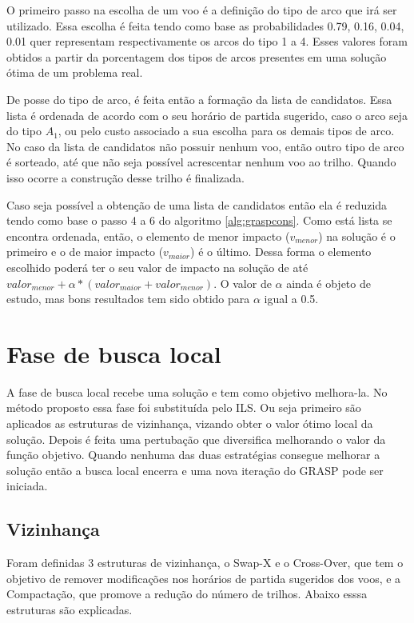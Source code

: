  O primeiro passo na escolha de um voo é a definição do tipo de arco que irá ser utilizado. Essa escolha é feita tendo como base as probabilidades 0.79, 0.16, 0.04, 0.01 quer representam respectivamente os arcos do tipo 1 a 4. Esses valores foram obtidos a partir da porcentagem dos tipos de arcos presentes em uma solução ótima de um problema real.
 
 De posse do tipo de arco, é feita então a formação da lista de candidatos. Essa lista é ordenada de acordo com o seu horário de partida sugerido, caso o arco seja do tipo $A_{1}$, ou pelo custo associado a sua escolha para os demais tipos de arco. No caso da lista de candidatos não possuir nenhum voo, então outro tipo de arco é sorteado, até que não seja possível acrescentar nenhum voo ao trilho. Quando isso ocorre a construção desse trilho é finalizada.
 
 Caso seja possível a obtenção de uma lista de candidatos então ela é reduzida tendo como base o passo 4 a 6 do algoritmo \ref{alg:graspcons}. Como está lista se encontra ordenada, então, o elemento de menor impacto ($v_{menor}$) na solução é o primeiro e o de maior impacto ($v_{maior}$) é o último. Dessa forma o elemento escolhido poderá ter o seu valor de impacto na solução de até $valor_{menor} + \alpha*(valor_{maior} + valor_{menor})$. O valor de $\alpha$ ainda é objeto de estudo, mas bons resultados tem sido obtido para $\alpha$ igual a 0.5.
 
 \section{Fase de busca local}
 
A fase de busca local recebe uma solução e tem como objetivo melhora-la. No método proposto essa fase foi substituída pelo ILS. Ou seja primeiro são aplicados as estruturas de vizinhança, vizando obter o valor ótimo local da solução. Depois é feita uma pertubação que diversifica melhorando o valor da função objetivo. Quando nenhuma das duas estratégias consegue melhorar a solução então a busca local encerra e uma nova iteração do GRASP pode ser iniciada.
 
 \subsection{Vizinhança}
 
 Foram definidas 3 estruturas de vizinhança, o Swap-X e o Cross-Over, que tem o objetivo de remover modificações nos horários de partida sugeridos dos voos, e a Compactação, que promove a redução do número de trilhos. Abaixo esssa estruturas são explicadas.
 
